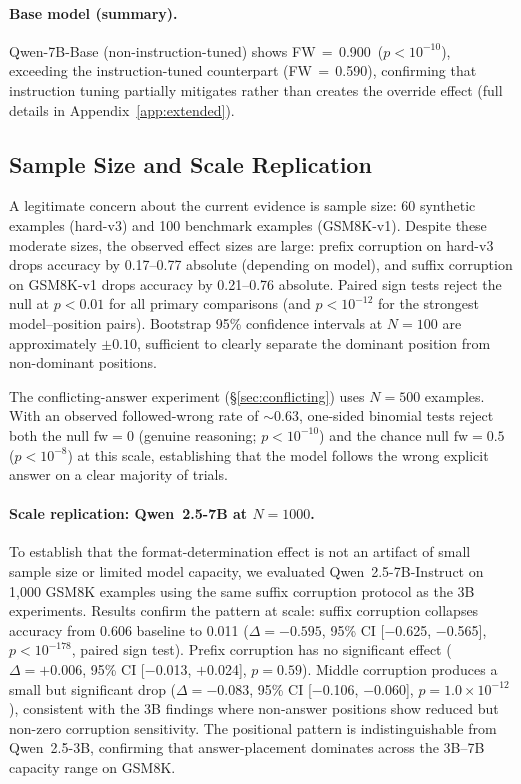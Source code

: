 \documentclass{article}
\theoremstyle{definition}
\theoremstyle{definition}
\newcommand{\CCFW}{0.63}
\newcommand{\CCPVAL}{$p{<}10^{-8}$}
\newcommand{\QWSBVONEFW}{0.590}
\newcommand{\QBASEVONEFW}{0.900}
\newcommand{\QBASEVONEPVAL}{$p{<}10^{-10}$}
\begin{document}
\paragraph{Base model (summary).}
Qwen-7B-Base (non-instruction-tuned) shows FW\,$=$\,\QBASEVONEFW\ (\QBASEVONEPVAL),
exceeding the instruction-tuned counterpart (FW\,$=$\,\QWSBVONEFW), confirming that
instruction tuning partially mitigates rather than creates the override effect
(full details in Appendix~\ref{app:extended}).


\subsection{Sample Size and Scale Replication}
\label{sec:samplesize_app}

A legitimate concern about the current evidence is sample size: 60
synthetic examples (hard-v3) and 100 benchmark examples (GSM8K-v1).
Despite these moderate sizes, the observed effect sizes are large:
prefix corruption on hard-v3 drops accuracy by 0.17--0.77 absolute
(depending on model), and suffix corruption on GSM8K-v1 drops accuracy
by 0.21--0.76 absolute. Paired sign tests reject the null at
$p < 0.01$ for all primary comparisons (and $p < 10^{-12}$ for the
strongest model--position pairs). Bootstrap 95\% confidence
intervals at $N{=}100$ are approximately $\pm 0.10$, sufficient to
clearly separate the dominant position from non-dominant positions.

The conflicting-answer experiment (\S\ref{sec:conflicting}) uses
$N{=}500$ examples. With an observed followed-wrong rate of $\sim$\CCFW,
one-sided binomial tests reject both the null $\text{fw}{=}0$ (genuine
reasoning; $p {<} 10^{-10}$) and the chance null $\text{fw}{=}0.5$
(\CCPVAL) at this scale, establishing that the model follows the wrong
explicit answer on a clear majority of trials.

\paragraph{Scale replication: Qwen~2.5-7B at $N{=}1000$.}
To establish that the format-determination effect is not an artifact of
small sample size or limited model capacity, we evaluated Qwen~2.5-7B-Instruct
on 1{,}000 GSM8K examples using the same suffix corruption protocol as the 3B
experiments. Results confirm the pattern at scale: suffix corruption
collapses accuracy from 0.606 baseline to 0.011 ($\Delta{=}{-}0.595$,
95\% CI [$-$0.625, $-$0.565], $p{<}10^{-178}$, paired sign test). Prefix corruption has no significant
effect ($\Delta{=}+0.006$, 95\% CI [$-$0.013, $+$0.024], $p{=}0.59$). Middle corruption produces a
small but significant drop ($\Delta{=}{-}0.083$, 95\% CI [$-$0.106, $-$0.060], $p{=}1.0{\times}10^{-12}$),
consistent with the 3B findings where non-answer positions show reduced
but non-zero corruption sensitivity. The positional pattern is
indistinguishable from Qwen~2.5-3B, confirming that answer-placement
dominates across the 3B--7B capacity range on GSM8K.
\end{document}

